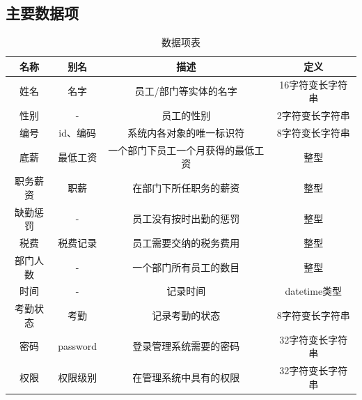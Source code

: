 \documentclass[withoutpreface,bwprint]{cumcmthesis} %
\begin{document}
\subsection{主要数据项}
\begin{table}[H]
\centering
\caption{数据项表}
\begin{tabular}{cccc}
\hline
\textbf{名称} & \textbf{别名} & \textbf{描述}       & \textbf{定义} \\ \hline
姓名          & 名字          & 员工/部门等实体的名字       & 16字符变长字符串   \\ \hline
性别          & -           & 员工的性别             & 2字符变长字符串    \\ \hline
编号          & id、编码       & 系统内各对象的唯一标识符      & 8字符变长字符串    \\ \hline
底薪          & 最低工资        & 一个部门下员工一个月获得的最低工资 & 整型          \\ \hline
职务薪资        & 职薪          & 在部门下所任职务的薪资       & 整型          \\ \hline
缺勤惩罚        & -        & 员工没有按时出勤的惩罚       & 整型          \\ \hline
税费          & 税费记录        & 员工需要交纳的税务费用       & 整型          \\ \hline
部门人数        & -           & 一个部门所有员工的数目       & 整型          \\ \hline
时间          & -           & 记录时间              & datetime类型  \\ \hline
考勤状态        & 考勤          & 记录考勤的状态           & 8字符变长字符串    \\ \hline
密码          & password    & 登录管理系统需要的密码       & 32字符变长字符串   \\ \hline
权限          & 权限级别        & 在管理系统中具有的权限       & 32字符变长字符串   \\ \hline
\end{tabular}
\end{table}
\end{document}
